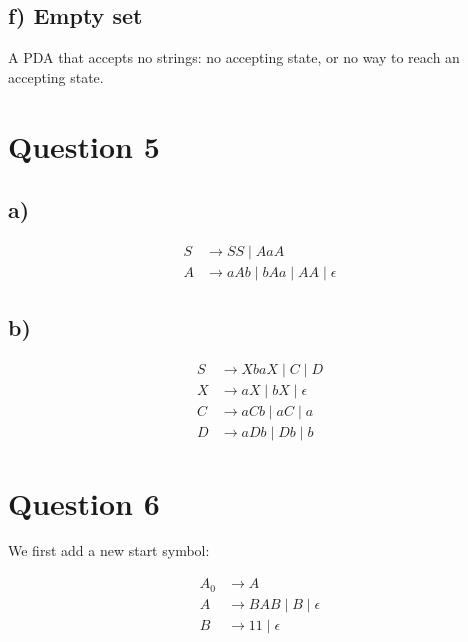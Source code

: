 \documentclass[a4paper, UTF-8]{article}
\theoremstyle{plain}
\begin{document}
\subsection{f) Empty set}

A PDA that accepts no strings: no accepting state, or no way to reach an accepting state.


\section{Question 5} 

\subsection{a)} 

\begin{align*} 
S &\to SS \mid AaA \\
A &\to a A b \mid b A a \mid A A \mid \epsilon
\end{align*}

\subsection{b)}

\begin{align*} 
S &\to X b a X \mid C \mid D \\
X &\to a X \mid b X \mid \epsilon \\
C &\to a C b \mid a C \mid a \\
D &\to a D b \mid D b \mid b
\end{align*}

\section{Question 6} 

We first add a new start symbol: 

\begin{align*} 
A_0 &\to A \\ 
A &\to B A B \mid B \mid \epsilon \\
B &\to 11 \mid \epsilon 
\end{align*}
\end{document}
